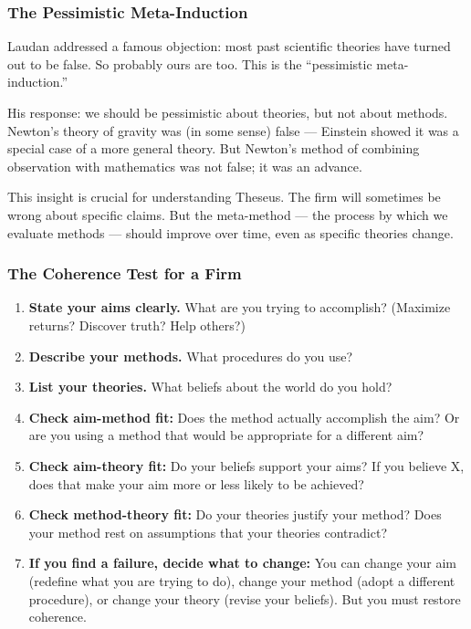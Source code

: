 \documentclass[11pt,letterpaper]{article}
\begin{document}
\subsubsection*{The Pessimistic Meta-Induction}

Laudan addressed a famous objection: most past scientific theories have turned out to be false. So probably ours are too. This is the ``pessimistic meta-induction.''

His response: we should be pessimistic about theories, but not about methods. Newton's theory of gravity was (in some sense) false — Einstein showed it was a special case of a more general theory. But Newton's method of combining observation with mathematics was not false; it was an advance.

This insight is crucial for understanding Theseus. The firm will sometimes be wrong about specific claims. But the meta-method — the process by which we evaluate methods — should improve over time, even as specific theories change.

\subsubsection*{The Coherence Test for a Firm}

\begin{enumerate}
  \item \textbf{State your aims clearly.} What are you trying to accomplish? (Maximize returns? Discover truth? Help others?)
  \item \textbf{Describe your methods.} What procedures do you use?
  \item \textbf{List your theories.} What beliefs about the world do you hold?
  \item \textbf{Check aim-method fit:} Does the method actually accomplish the aim? Or are you using a method that would be appropriate for a different aim?
  \item \textbf{Check aim-theory fit:} Do your beliefs support your aims? If you believe X, does that make your aim more or less likely to be achieved?
  \item \textbf{Check method-theory fit:} Do your theories justify your method? Does your method rest on assumptions that your theories contradict?
  \item \textbf{If you find a failure, decide what to change:} You can change your aim (redefine what you are trying to do), change your method (adopt a different procedure), or change your theory (revise your beliefs). But you must restore coherence.
\end{enumerate}
\end{document}
